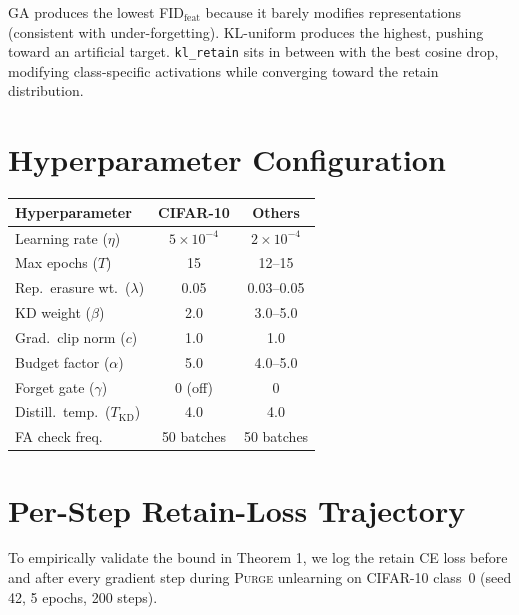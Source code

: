 \documentclass[letterpaper]{article}
\newcommand{\ours}{\textsc{Purge}}
\newcommand{\klr}{\texttt{kl\_retain}}
\begin{document}
GA produces the lowest FID$_{\text{feat}}$ because it barely modifies representations (consistent with under-forgetting). KL-uniform produces the highest, pushing toward an artificial target. \klr{} sits in between with the best cosine drop, modifying class-specific activations while converging toward the retain distribution.

\section{Hyperparameter Configuration}

\begin{center}
\small
\begin{tabular}{lcc}
\toprule
\textbf{Hyperparameter} & \textbf{CIFAR-10} & \textbf{Others} \\
\midrule
Learning rate ($\eta$) & $5 \times 10^{-4}$ & $2 \times 10^{-4}$ \\
Max epochs ($T$) & 15 & 12--15 \\
Rep.\ erasure wt.\ ($\lambda$) & 0.05 & 0.03--0.05 \\
KD weight ($\beta$) & 2.0 & 3.0--5.0 \\
Grad.\ clip norm ($c$) & 1.0 & 1.0 \\
Budget factor ($\alpha$) & 5.0 & 4.0--5.0 \\
Forget gate ($\gamma$) & 0 (off) & 0 \\
Distill.\ temp.\ ($T_{\mathrm{KD}}$) & 4.0 & 4.0 \\
FA check freq. & 50 batches & 50 batches \\
\bottomrule
\end{tabular}
\end{center}

\section{Per-Step Retain-Loss Trajectory}

To empirically validate the bound in Theorem 1, we log the retain CE loss before and after every gradient step during \ours{} unlearning on CIFAR-10 class~0 (seed 42, 5 epochs, 200 steps).
\end{document}
